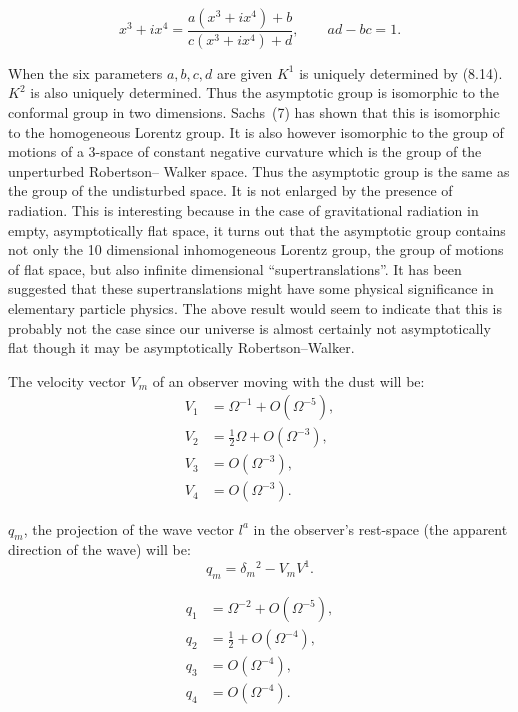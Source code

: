 \begin{equation}
x^3+i x^4
=
\frac{a(x^3+i x^4)+b}{c(x^3+i x^4)+d},
\qquad
ad-bc=1.
\tag{8.15}
\end{equation}

When the six parameters $a,b,c,d$ are given $K^1$ is uniquely
determined by (8.14). $K^2$ is also uniquely determined. Thus
the asymptotic group is isomorphic to the conformal group in
two dimensions. Sachs~(7) has shown that this is isomorphic
to the homogeneous Lorentz group. It is also however isomorphic
to the group of motions of a 3-space of constant negative
curvature which is the group of the unperturbed Robertson--
Walker space. Thus the asymptotic group is the same as the
group of the undisturbed space. It is not enlarged by the
presence of radiation. This is interesting because in the
case of gravitational radiation in empty, asymptotically flat
space, it turns out that the asymptotic group contains not
only the 10 dimensional inhomogeneous Lorentz group, the group
of motions of flat space, but also infinite dimensional
``supertranslations''. It has been suggested that these
supertranslations might have some physical significance in
elementary particle physics. The above result would seem
to indicate that this is probably not the case since our
universe is almost certainly not asymptotically flat though
it may be asymptotically Robertson--Walker.


The velocity vector $V_m$ of an observer moving with the
dust will be:
\begin{equation}
\begin{aligned}
V_1&=\Omega^{-1}+O(\Omega^{-5}),\\
V_2&=\frac{1}{2}\Omega+O(\Omega^{-3}),\\
V_3&=O(\Omega^{-3}),\\
V_4&=O(\Omega^{-3}).
\end{aligned}
\tag{9.1}
\end{equation}

$q_m$, the projection of the wave vector $l^a$ in the
observer's rest-space (the apparent direction of the wave)
will be:
\[
q_m=\delta_m{}^2-V_mV^1.
\]

\begin{equation}
\begin{aligned}
q_1&=\Omega^{-2}+O(\Omega^{-5}),\\
q_2&=\frac{1}{2}+O(\Omega^{-4}),\\
q_3&=O(\Omega^{-4}),\\
q_4&=O(\Omega^{-4}).
\end{aligned}
\tag{9.2}
\end{equation}

